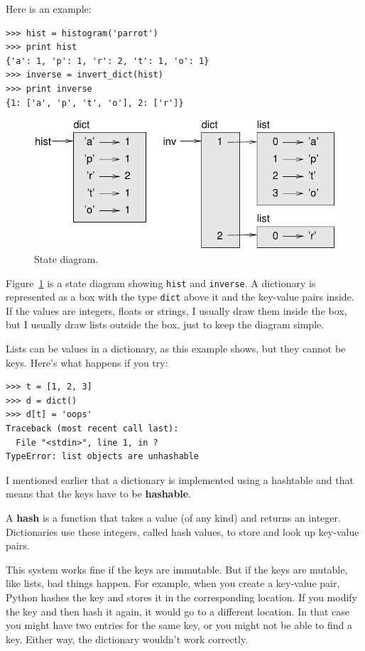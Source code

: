 \documentclass[10pt]{book}
\begin{document}
Here is an example:

\begin{verbatim}
>>> hist = histogram('parrot')
>>> print hist
{'a': 1, 'p': 1, 'r': 2, 't': 1, 'o': 1}
>>> inverse = invert_dict(hist)
>>> print inverse
{1: ['a', 'p', 't', 'o'], 2: ['r']}
\end{verbatim}

\begin{figure}
\centerline
{\includegraphics[scale=0.8]{figs/dict1.pdf}}
\caption{State diagram.}
\label{fig.dict1}
\end{figure}

Figure~\ref{fig.dict1} is a state diagram showing {\tt hist} and {\tt inverse}.
A dictionary is represented as a box with the type {\tt dict} above it
and the key-value pairs inside.  If the values are integers, floats or
strings, I usually draw them inside the box, but I usually draw lists
outside the box, just to keep the diagram simple.

Lists can be values in a dictionary, as this example shows, but they
cannot be keys.  Here's what happens if you try:


\begin{verbatim}
>>> t = [1, 2, 3]
>>> d = dict()
>>> d[t] = 'oops'
Traceback (most recent call last):
  File "<stdin>", line 1, in ?
TypeError: list objects are unhashable
\end{verbatim}
%
I mentioned earlier that a dictionary is implemented using
a hashtable and that means that the keys have to be {\bf hashable}.

A {\bf hash} is a function that takes a value (of any kind)
and returns an integer.  Dictionaries use these integers,
called hash values, to store and look up key-value pairs.

This system works fine if the keys are immutable.  But if the
keys are mutable, like lists, bad things happen.  For example,
when you create a key-value pair, Python hashes the key and
stores it in the corresponding location.  If you modify the
key and then hash it again, it would go to a different location.
In that case you might have two entries for the same key,
or you might not be able to find a key.  Either way, the
dictionary wouldn't work correctly.
\end{document}

